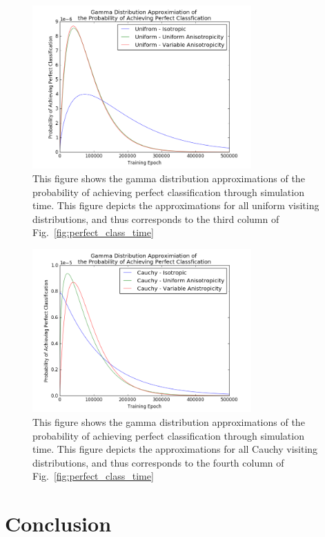 \documentclass[11pt]{afthesis}
\begin{document}
	\begin{figure} 
		\includegraphics[width = 3.3in, trim={0.5cm 0 1.2cm 0.0cm},clip]{figures/gammaDists/gamma_u.png}
		\caption{This figure shows the gamma distribution approximations of the probability of achieving perfect classification through simulation time. This figure depicts the approximations for all uniform visiting distributions, and thus corresponds to the third column of Fig.~\ref{fig:perfect_class_time}}
		\label{fig:uniform_gamma}
	\end{figure}
	
	\begin{figure} 
		\includegraphics[width = 3.3in, trim={0.5cm 0 1.2cm 0.0cm},clip]{figures/gammaDists/gamma_c.png}
		\caption{This figure shows the gamma distribution approximations of the probability of achieving perfect classification through simulation time. This figure depicts the approximations for all Cauchy visiting distributions, and thus corresponds to the fourth column of Fig.~\ref{fig:perfect_class_time}}
		\label{fig:cauchy_gamma}
	\end{figure}
	
	
	\section{Conclusion}
	
\end{document}
